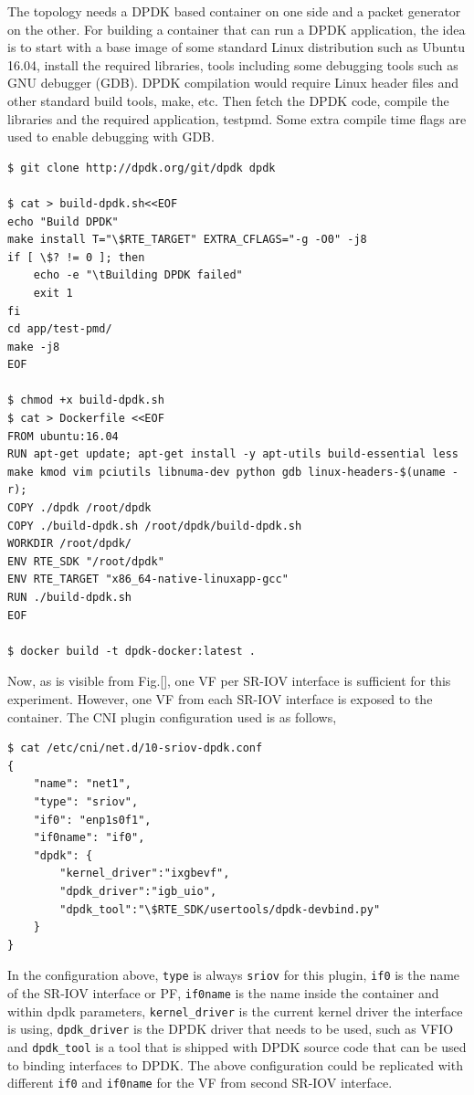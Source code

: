 \documentclass[english, 12pt, a4paper, elec, utf8, a-1b, online]{aaltothesis}
\begin{document}
The topology needs a DPDK based container on one side and a packet generator on the other. For building a container that can run a DPDK application, the idea is to start with a base image of some standard Linux distribution such as Ubuntu 16.04, install the required libraries, tools including some debugging tools such as GNU debugger (GDB). DPDK compilation would require Linux header files and other standard build tools, make, etc. Then fetch the DPDK code, compile the libraries and the required application, testpmd. Some extra compile time flags are used to enable debugging with GDB.

\begin{lstlisting}[basicstyle={\small\ttfamily}]
$ git clone http://dpdk.org/git/dpdk dpdk

$ cat > build-dpdk.sh<<EOF
echo "Build DPDK"
make install T="\$RTE_TARGET" EXTRA_CFLAGS="-g -O0" -j8
if [ \$? != 0 ]; then
    echo -e "\tBuilding DPDK failed"
    exit 1
fi
cd app/test-pmd/
make -j8
EOF

$ chmod +x build-dpdk.sh
$ cat > Dockerfile <<EOF
FROM ubuntu:16.04
RUN apt-get update; apt-get install -y apt-utils build-essential less make kmod vim pciutils libnuma-dev python gdb linux-headers-$(uname -r);
COPY ./dpdk /root/dpdk
COPY ./build-dpdk.sh /root/dpdk/build-dpdk.sh
WORKDIR /root/dpdk/
ENV RTE_SDK "/root/dpdk"
ENV RTE_TARGET "x86_64-native-linuxapp-gcc"
RUN ./build-dpdk.sh
EOF

$ docker build -t dpdk-docker:latest .
\end{lstlisting}

Now, as is visible from Fig.[], one VF per SR-IOV interface is sufficient for this experiment. However, one VF from each SR-IOV interface is exposed to the container. The CNI plugin configuration used is as follows,
\begin{lstlisting}[basicstyle={\small\ttfamily}]
$ cat /etc/cni/net.d/10-sriov-dpdk.conf
{
    "name": "net1",
    "type": "sriov",
    "if0": "enp1s0f1",
    "if0name": "if0",
    "dpdk": {
        "kernel_driver":"ixgbevf",
        "dpdk_driver":"igb_uio",
        "dpdk_tool":"\$RTE_SDK/usertools/dpdk-devbind.py"
    }
}
\end{lstlisting}

In the configuration above, \lstinline{type} is always \lstinline{sriov} for this plugin, \lstinline{if0} is the name of the SR-IOV interface or PF, \lstinline{if0name} is the name inside the container and within dpdk parameters, \lstinline{kernel_driver} is the current kernel driver the interface is using, \lstinline{dpdk_driver} is the DPDK driver that needs to be used, such as VFIO and \lstinline{dpdk_tool} is a tool that is shipped with DPDK source code that can be used to binding interfaces to DPDK. The above configuration could be replicated with different \lstinline{if0} and \lstinline{if0name} for the VF from second SR-IOV interface.
\end{document}

